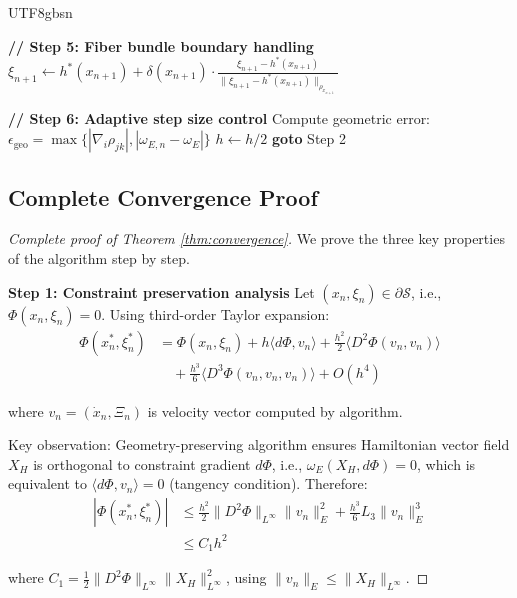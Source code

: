 \documentclass[a4paper,12pt]{extarticle}
\theoremstyle{definition}
\begin{document}
\begin{CJK}{UTF8}{gbsn}
\begin{algorithm}[H]
\begin{algorithmic}[1]
    \State \textbf{// Step 5: Fiber bundle boundary handling}
        \State $\xi_{n+1} \leftarrow h^*(x_{n+1}) + \delta(x_{n+1}) \cdot \frac{\xi_{n+1} - h^*(x_{n+1})}{\|\xi_{n+1} - h^*(x_{n+1})\|_{\rho_{x_{n+1}}}}$
    \EndIf
    
    \State \textbf{// Step 6: Adaptive step size control}
    \State Compute geometric error: $\epsilon_{\text{geo}} = \max\{|\nabla_i \rho_{jk}|, |\omega_{E,n} - \omega_E|\}$
        \State $h \leftarrow h/2$ 
        \State \textbf{goto} Step 2 
    \EndIf
\EndFor
\end{algorithmic}
\end{algorithm}

\subsection{Complete Convergence Proof}
\label{appendix:convergence_proof}

\begin{proof}[Complete proof of Theorem \ref{thm:convergence}]
We prove the three key properties of the algorithm step by step.

\textbf{Step 1: Constraint preservation analysis}
Let $(x_n, \xi_n) \in \partial\mathcal{S}$, i.e., $\Phi(x_n, \xi_n) = 0$. Using third-order Taylor expansion:
\begin{align*}
\Phi(x^*_n, \xi^*_n) &= \Phi(x_n, \xi_n) + h\langle d\Phi, v_n \rangle + \frac{h^2}{2}\langle D^2\Phi(v_n, v_n) \rangle \\
&\quad + \frac{h^3}{6}\langle D^3\Phi(v_n, v_n, v_n) \rangle + O(h^4)
\end{align*}

where $v_n = (\dot{x}_n, \Xi_n)$ is velocity vector computed by algorithm.

Key observation: Geometry-preserving algorithm ensures Hamiltonian vector field $X_H$ is orthogonal to constraint gradient $d\Phi$, i.e., $\omega_E(X_H, d\Phi) = 0$, which is equivalent to $\langle d\Phi, v_n \rangle = 0$ (tangency condition). Therefore:
\begin{align*}
|\Phi(x^*_n, \xi^*_n)| &\leq \frac{h^2}{2}\|D^2\Phi\|_{L^\infty}\|v_n\|_E^2 + \frac{h^3}{6}L_3\|v_n\|_E^3 \\
&\leq C_1 h^2
\end{align*}

where $C_1 = \frac{1}{2}\|D^2\Phi\|_{L^\infty}\|X_H\|_{L^\infty}^2$, using $\|v_n\|_E \leq \|X_H\|_{L^\infty}$.


\end{proof}
\end{CJK}
\end{document}
